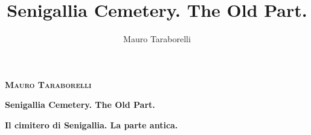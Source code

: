 \documentclass
[ 10pt ,
  final ,
  openany ]
{book}
\title{Senigallia Cemetery. The Old Part.}
\author{Mauro Taraborelli}
\begin{document}
\pagestyle{empty}

\begin{center}

\vspace*{2in}

{\fontsize{.4in}{.4in}\selectfont \textbf{\textsf{\textsc{Mauro Taraborelli}}}}

\vspace*{0.5in}

{\fontsize{.6in}{.6in}\selectfont \textbf{\textsf{Senigallia Cemetery. The Old Part.}}}

{\fontsize{.4in}{.4in}\selectfont \textbf{\textsf{Il cimitero di Senigallia. La parte antica.}}}

\end{center}

\newpage



\end{document}
